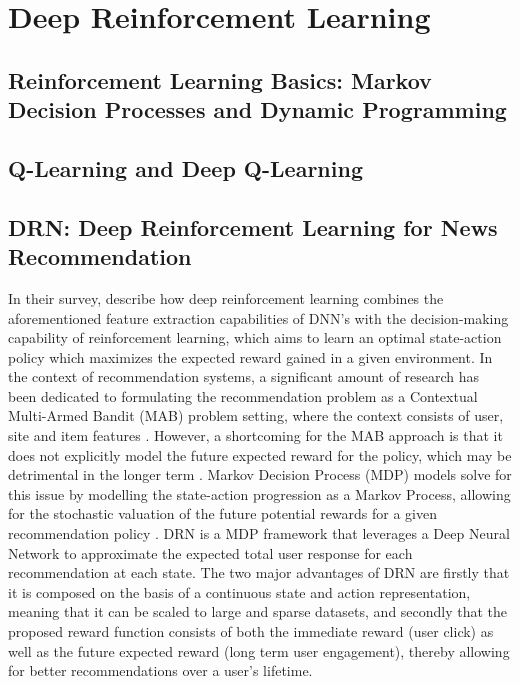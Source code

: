 \documentclass{mldsmsc}
\begin{document}
\section{Deep Reinforcement Learning}

\subsection{Reinforcement Learning Basics: Markov Decision Processes and Dynamic Programming}

\subsection{Q-Learning and Deep Q-Learning}

\subsection{DRN: Deep Reinforcement Learning for News Recommendation}

In their survey, \citep{RefWorks:wang2024deep} describe how deep reinforcement learning combines 
the aforementioned feature extraction capabilities of DNN’s with the decision-making 
capability of reinforcement learning, which aims to learn an optimal state-action policy 
which maximizes the expected reward gained in a given environment. In the context of 
recommendation systems, a significant amount of research has been dedicated to formulating 
the recommendation problem as a Contextual Multi-Armed Bandit (MAB) problem setting, where 
the context consists of user, site and item features \citep{RefWorks:bouneffouf2012contextual-bandit,RefWorks:li2010contextual-bandit,RefWorks:zeng2016online}. 
However, a shortcoming for the MAB approach 
is that it does not explicitly model the future expected reward for the policy, which may 
be detrimental in the longer term \citep{RefWorks:zheng2018drn:}. Markov Decision Process (MDP) models 
solve for this issue by modelling the state-action progression as a Markov Process, allowing 
for the stochastic valuation of the future potential rewards for a given recommendation 
policy \citep{RefWorks:lu2016partially,RefWorks:mahmood2007learning}. DRN \citep{RefWorks:zheng2018drn:} is a MDP framework 
that leverages a Deep Neural Network to approximate the expected total user response for 
each recommendation at each state. The two major advantages of DRN are firstly that it is 
composed on the basis of a continuous state and action representation, meaning that it can 
be scaled to large and sparse datasets, and secondly that the proposed reward function 
consists of both the immediate reward (user click) as well as the future expected reward 
(long term user engagement), thereby allowing for better recommendations over a user’s 
lifetime.
\end{document}
